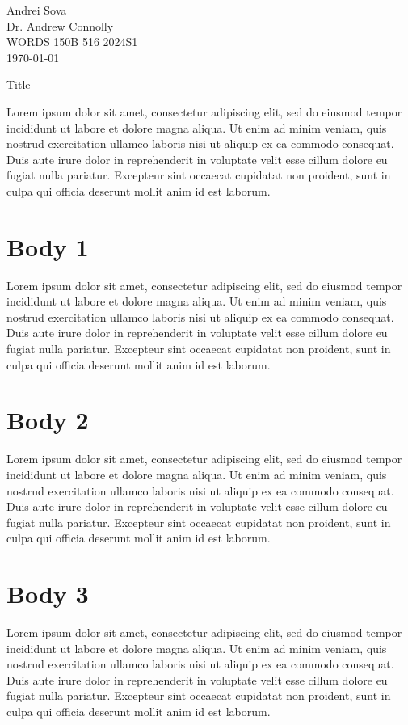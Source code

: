 \documentclass[12pt]{article}
\newcommand{\authorfirstname}{Andrei}
\newcommand{\authorlastname}{Sova}
\newcommand{\authorprof}{Dr. Andrew Connolly}
\newcommand{\authorclass}{WORDS 150B 516 2024S1}
\begin{document}
\noindent \authorfirstname{} \authorlastname{} \\
\noindent \authorprof{} \\
\noindent \authorclass{} \\
\noindent \mladate\today

\centerline{Title} 

Lorem ipsum dolor sit amet, consectetur adipiscing elit, sed do eiusmod tempor incididunt ut labore et dolore magna aliqua. Ut enim ad minim veniam, quis nostrud exercitation ullamco laboris nisi ut aliquip ex ea commodo consequat. Duis aute irure dolor in reprehenderit in voluptate velit esse cillum dolore eu fugiat nulla pariatur. Excepteur sint occaecat cupidatat non proident, sunt in culpa qui officia deserunt mollit anim id est laborum.

\section*{Body 1}
Lorem ipsum dolor sit amet, consectetur adipiscing elit, sed do eiusmod tempor incididunt ut labore et dolore magna aliqua. Ut enim ad minim veniam, quis nostrud exercitation ullamco laboris nisi ut aliquip ex ea commodo consequat. Duis aute irure dolor in reprehenderit in voluptate velit esse cillum dolore eu fugiat nulla pariatur. Excepteur sint occaecat cupidatat non proident, sunt in culpa qui officia deserunt mollit anim id est laborum.

\section*{Body 2} 
Lorem ipsum dolor sit amet, consectetur adipiscing elit, sed do eiusmod tempor incididunt ut labore et dolore magna aliqua. Ut enim ad minim veniam, quis nostrud exercitation ullamco laboris nisi ut aliquip ex ea commodo consequat. Duis aute irure dolor in reprehenderit in voluptate velit esse cillum dolore eu fugiat nulla pariatur. Excepteur sint occaecat cupidatat non proident, sunt in culpa qui officia deserunt mollit anim id est laborum.

\section*{Body 3}
Lorem ipsum dolor sit amet, consectetur adipiscing elit, sed do eiusmod tempor incididunt ut labore et dolore magna aliqua. Ut enim ad minim veniam, quis nostrud exercitation ullamco laboris nisi ut aliquip ex ea commodo consequat. Duis aute irure dolor in reprehenderit in voluptate velit esse cillum dolore eu fugiat nulla pariatur. Excepteur sint occaecat cupidatat non proident, sunt in culpa qui officia deserunt mollit anim id est laborum.
\end{document}
